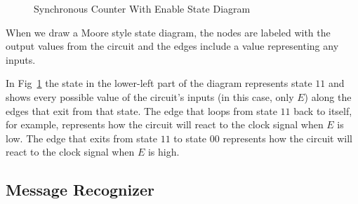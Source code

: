 \documentclass[10pt,letterpaper]{article}
\begin{document}
\begin{figure}[ht] 
\centering 
{}
\caption{Synchronous Counter With Enable State Diagram}
\label{fsm:synchronous.counter.enable}
\end{figure}

When we draw a Moore style state diagram, the nodes are labeled with the
output values from the circuit and the edges include a value representing
any inputs.

In Fig~\ref{fsm:synchronous.counter.enable} the state in the lower-left part of 
the diagram represents state $11$ and shows every possible value of the circuit's
inputs (in this case, only $E$) along the edges that exit from that state.
The edge that loops from state $11$ back to itself, for example, represents 
how the circuit will react to the clock signal when $E$ is low.  The edge
that exits from state $11$ to state $00$ represents how the circuit will react 
to the clock signal when $E$ is high.









\subsection{Message Recognizer}
\end{document}
